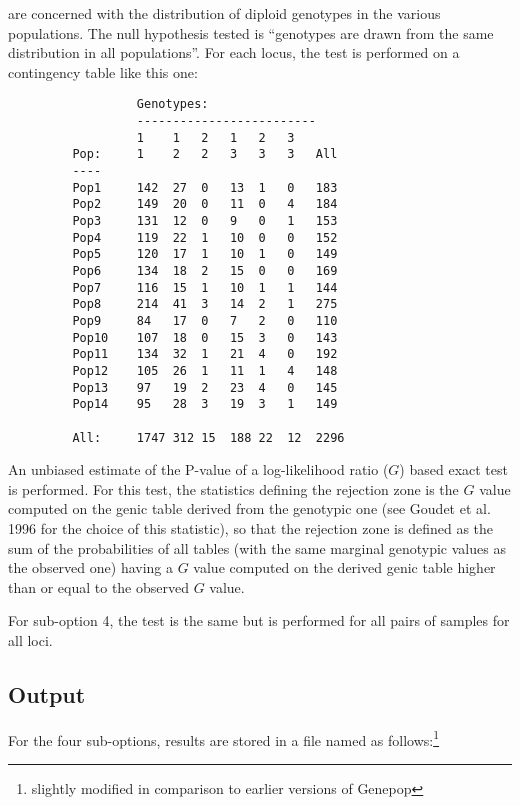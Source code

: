 \documentclass[12pt,]{book}
\let\rmarkdownfootnote\footnote%
\def\footnote{\protect\rmarkdownfootnote}
\theoremstyle{definition}
\theoremstyle{definition}
\theoremstyle{definition}
\theoremstyle{remark}
\begin{document}
 are concerned with the distribution of
diploid genotypes in the various populations. The null hypothesis tested
is ``genotypes are drawn from the same distribution in all
populations''. For each locus, the test is performed on a contingency
table like this one:

\begin{verbatim}
                  Genotypes:
                  -------------------------
                  1    1   2   1   2   3
         Pop:     1    2   2   3   3   3   All
         ----
         Pop1     142  27  0   13  1   0   183
         Pop2     149  20  0   11  0   4   184
         Pop3     131  12  0   9   0   1   153
         Pop4     119  22  1   10  0   0   152
         Pop5     120  17  1   10  1   0   149
         Pop6     134  18  2   15  0   0   169
         Pop7     116  15  1   10  1   1   144
         Pop8     214  41  3   14  2   1   275
         Pop9     84   17  0   7   2   0   110
         Pop10    107  18  0   15  3   0   143
         Pop11    134  32  1   21  4   0   192
         Pop12    105  26  1   11  1   4   148
         Pop13    97   19  2   23  4   0   145
         Pop14    95   28  3   19  3   1   149

         All:     1747 312 15  188 22  12  2296
\end{verbatim}

An unbiased estimate of the P-value of a log-likelihood ratio (\(G\))
based exact test is performed. For this test, the statistics defining
the rejection zone is the \(G\) value computed on the genic table
derived from the genotypic one (see Goudet et al. 1996 for the choice of
this statistic), so that the
rejection zone is defined as the sum of the probabilities of all tables
(with the same marginal genotypic values as the observed one) having a
\(G\) value computed on the derived genic table higher than or equal to
the observed \(G\) value.

For sub-option 4, the test is the same but is performed for all pairs of
samples for all loci.

\subsection{Output}\label{output-2}

For the four sub-options, results are stored in a file named as
follows:\footnote{slightly modified in comparison to earlier versions of
  Genepop}
\end{document}
